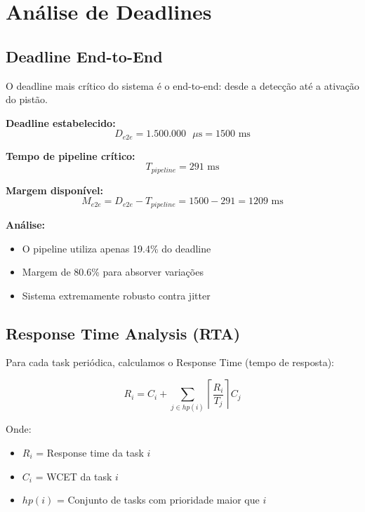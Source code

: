\documentclass[12pt,a4paper]{article}
\begin{document}
\section{Análise de Deadlines}

\subsection{Deadline End-to-End}

O deadline mais crítico do sistema é o end-to-end: desde a detecção até a ativação do pistão.

\textbf{Deadline estabelecido:}
\begin{equation}
D_{e2e} = 1.500.000 \text{ } \mu\text{s} = 1500 \text{ ms}
\end{equation}

\textbf{Tempo de pipeline crítico:}
\begin{equation}
T_{pipeline} = 291 \text{ ms}
\end{equation}

\textbf{Margem disponível:}
\begin{equation}
M_{e2e} = D_{e2e} - T_{pipeline} = 1500 - 291 = 1209 \text{ ms}
\end{equation}

\textbf{Análise:}
\begin{itemize}
    \item O pipeline utiliza apenas 19.4\% do deadline
    \item Margem de 80.6\% para absorver variações
    \item Sistema extremamente robusto contra jitter
\end{itemize}

\subsection{Response Time Analysis (RTA)}

Para cada task periódica, calculamos o Response Time (tempo de resposta):

\begin{equation}
R_i = C_i + \sum_{j \in hp(i)} \left\lceil \frac{R_i}{T_j} \right\rceil C_j
\end{equation}

Onde:
\begin{itemize}
    \item $R_i$ = Response time da task $i$
    \item $C_i$ = WCET da task $i$
    \item $hp(i)$ = Conjunto de tasks com prioridade maior que $i$
\end{itemize}
\end{document}
